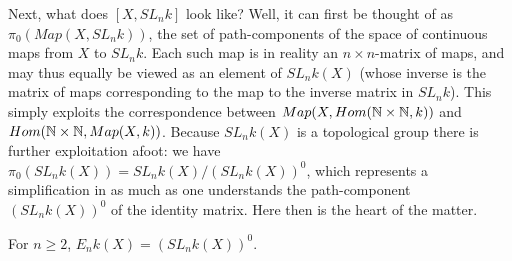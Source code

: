 Next, what does $[X,SL_n k]$ look like? Well, it can first be thought of as $\pi_0(Map(X,SL_n k))$, the set of path-components of the space of continuous maps from $X$ to $SL_nk$. Each such map is in reality an $n\times n$-matrix of maps, and may thus equally be viewed as an element of $SL_n k(X)$ (whose inverse is the matrix of maps corresponding to the map to the inverse matrix in $SL_n k $). This simply exploits the correspondence between $Map(X,Hom(\mathbb{N}\times \mathbb{N},k))$ and
$Hom(\mathbb{N}\times \mathbb{N},Map(X,k))$. Because $SL_nk(X)$ is a topological group there is further exploitation afoot: we have $\pi_0(SL_nk(X))=SL_nk(X)/(SL_nk(X))^0$, which represents a simplification in as much as one understands the path-component $(SL_nk(X))^0$ of the identity matrix. Here then is the heart of the matter.
\begin{lemma}
For $n\geqslant 2$, $E_nk(X)=(SL_nk(X))^0$.
\end{lemma}
